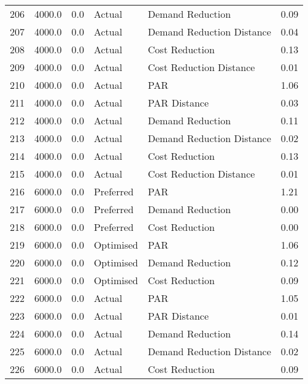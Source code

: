 \begin{longtable}{lrrllr}
206  &       4000.0 &     0.0 &         Actual &           Demand Reduction &   0.09 \\
207  &       4000.0 &     0.0 &         Actual &  Demand Reduction Distance &   0.04 \\
208  &       4000.0 &     0.0 &         Actual &             Cost Reduction &   0.13 \\
209  &       4000.0 &     0.0 &         Actual &    Cost Reduction Distance &   0.01 \\
210  &       4000.0 &     0.0 &         Actual &                        PAR &   1.06 \\
211  &       4000.0 &     0.0 &         Actual &               PAR Distance &   0.03 \\
212  &       4000.0 &     0.0 &         Actual &           Demand Reduction &   0.11 \\
213  &       4000.0 &     0.0 &         Actual &  Demand Reduction Distance &   0.02 \\
214  &       4000.0 &     0.0 &         Actual &             Cost Reduction &   0.13 \\
215  &       4000.0 &     0.0 &         Actual &    Cost Reduction Distance &   0.01 \\
216  &       6000.0 &     0.0 &      Preferred &                        PAR &   1.21 \\
217  &       6000.0 &     0.0 &      Preferred &           Demand Reduction &   0.00 \\
218  &       6000.0 &     0.0 &      Preferred &             Cost Reduction &   0.00 \\
219  &       6000.0 &     0.0 &      Optimised &                        PAR &   1.06 \\
220  &       6000.0 &     0.0 &      Optimised &           Demand Reduction &   0.12 \\
221  &       6000.0 &     0.0 &      Optimised &             Cost Reduction &   0.09 \\
222  &       6000.0 &     0.0 &         Actual &                        PAR &   1.05 \\
223  &       6000.0 &     0.0 &         Actual &               PAR Distance &   0.01 \\
224  &       6000.0 &     0.0 &         Actual &           Demand Reduction &   0.14 \\
225  &       6000.0 &     0.0 &         Actual &  Demand Reduction Distance &   0.02 \\
226  &       6000.0 &     0.0 &         Actual &             Cost Reduction &   0.09 \\

\end{longtable}
